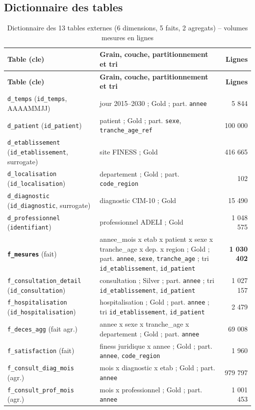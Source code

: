 \documentclass[11pt,a4paper]{article}
\begin{document}
\subsection{Dictionnaire des tables}
{\footnotesize\setlength{\tabcolsep}{3pt}\begin{longtable}{p{4.4cm}p{9.0cm}r}
\caption{Dictionnaire des 13 tables externes (6 dimensions, 5 faits, 2 agregats) -- volumes mesures en lignes}\\
\toprule
\textbf{Table (cle)} & \textbf{Grain, couche, partitionnement et tri} & \textbf{Lignes} \\
\midrule
\endfirsthead
\toprule
\textbf{Table (cle)} & \textbf{Grain, couche, partitionnement et tri} & \textbf{Lignes} \\
\midrule
\endhead
\texttt{d\_temps} (\texttt{id\_temps}, AAAAMMJJ) & jour 2015--2030 ; Gold ; part. \texttt{annee} & 5 844 \\
\texttt{d\_patient} (\texttt{id\_patient}) & patient ; Gold ; part. \texttt{sexe}, \texttt{tranche\_age\_ref} & 100 000 \\
\texttt{d\_etablissement} (\texttt{id\_etablissement}, surrogate) & site FINESS ; Gold & 416 665 \\
\texttt{d\_localisation} (\texttt{id\_localisation}) & departement ; Gold ; part. \texttt{code\_region} & 102 \\
\texttt{d\_diagnostic} (\texttt{id\_diagnostic}, surrogate) & diagnostic CIM-10 ; Gold & 15 490 \\
\texttt{d\_professionnel} (\texttt{identifiant}) & professionnel ADELI ; Gold & 1 048 575 \\
\textbf{\texttt{f\_mesures}} (fait) & annee\_mois x etab x patient x sexe x tranche\_age x dep. x region ; Gold ; part. \texttt{annee}, \texttt{sexe}, \texttt{tranche\_age} ; tri \texttt{id\_etablissement}, \texttt{id\_patient} & \textbf{1 030 402} \\
\texttt{f\_consultation\_detail} (\texttt{id\_consultation}) & consultation ; Silver ; part. \texttt{annee} ; tri \texttt{id\_etablissement}, \texttt{id\_patient} & 1 027 157 \\
\texttt{f\_hospitalisation} (\texttt{id\_hospitalisation}) & hospitalisation ; Gold ; part. \texttt{annee} ; tri \texttt{id\_etablissement}, \texttt{id\_patient} & 2 479 \\
\texttt{f\_deces\_agg} (fait agr.) & annee x sexe x tranche\_age x departement ; Gold ; part. \texttt{annee} & 69 008 \\
\texttt{f\_satisfaction} (fait) & finess juridique x annee ; Gold ; part. \texttt{annee}, \texttt{code\_region} & 1 960 \\
\texttt{f\_consult\_diag\_mois} (agr.) & mois x diagnostic x etab ; Gold ; part. \texttt{annee} & 979 797 \\
\texttt{f\_consult\_prof\_mois} (agr.) & mois x professionnel ; Gold ; part. \texttt{annee} & 1 001 453 \\
\bottomrule
\end{longtable}}
\end{document}
